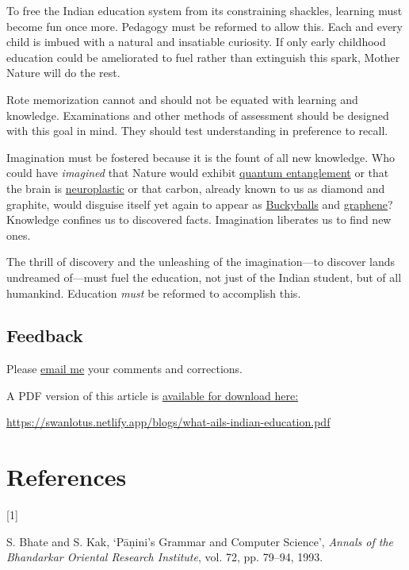 \documentclass[
  a4paper,
]{article}
\newlength{\cslhangindent}
\newlength{\csllabelwidth}
\newlength{\cslentryspacingunit} %
\newenvironment{CSLReferences}[2] %
 {%
  \setlength{\parindent}{0pt}
  \ifodd #1
  \let\oldpar\par
  \def\par{\hangindent=\cslhangindent\oldpar}
  \fi
  \setlength{\parskip}{#2\cslentryspacingunit}
 }%
 {}
\newcommand{\CSLLeftMargin}[1]{\parbox[t]{\csllabelwidth}{#1}}
\newcommand{\CSLRightInline}[1]{\parbox[t]{\linewidth - \csllabelwidth}{#1}\break}
\begin{document}
To free the Indian education system from its constraining shackles,
learning must become fun once more. Pedagogy must be reformed to allow
this. Each and every child is imbued with a natural and insatiable
curiosity. If only early childhood education could be ameliorated to
fuel rather than extinguish this spark, Mother Nature will do the rest.

Rote memorization cannot and should not be equated with learning and
knowledge. Examinations and other methods of assessment should be
designed with this goal in mind. They should test understanding in
preference to recall.

Imagination must be fostered because it is the fount of all new
knowledge. Who could have \emph{imagined} that Nature would exhibit
\href{http://www.youtube.com/watch?v=0Eeuqh9QfNI\&list=TLlNpED2t9U9sv5MXb2p3Bdqhg2XFcWnBG}{quantum
entanglement} or that the brain is
\href{http://faculty.washington.edu/chudler/plast.html}{neuroplastic} or
that carbon, already known to us as diamond and graphite, would disguise
itself yet again to appear as
\href{http://en.wikipedia.org/wiki/Bucky_balls}{Buckyballs} and
\href{http://www.graphene.manchester.ac.uk/}{graphene}? Knowledge
confines us to discovered facts. Imagination liberates us to find new
ones.

The thrill of discovery and the unleashing of the imagination---to
discover lands undreamed of---must fuel the education, not just of the
Indian student, but of all humankind. Education \emph{must} be reformed
to accomplish this.

\hypertarget{feedback}{%
\subsection{Feedback}\label{feedback}}

Please \href{mailto:feedback.swanlotus@gmail.com}{email me} your
comments and corrections.

\noindent A PDF version of this article is
\href{./what-ails-indian-education.pdf}{available for download here:}

\begin{footnotesize}

\url{https://swanlotus.netlify.app/blogs/what-ails-indian-education.pdf}

\end{footnotesize}

\hypertarget{bibliography}{%
\section*{References}\label{bibliography}}

\hypertarget{refs}{}
\begin{CSLReferences}{0}{0}
\leavevmode{}%
\CSLLeftMargin{{[}1{]} }
\CSLRightInline{S. Bhate and S. Kak, {`{Pāṇini's Grammar and Computer
Science}'}, \emph{Annals of the Bhandarkar Oriental Research Institute},
vol. 72, pp. 79--94, 1993. }

\end{CSLReferences}
\end{document}
